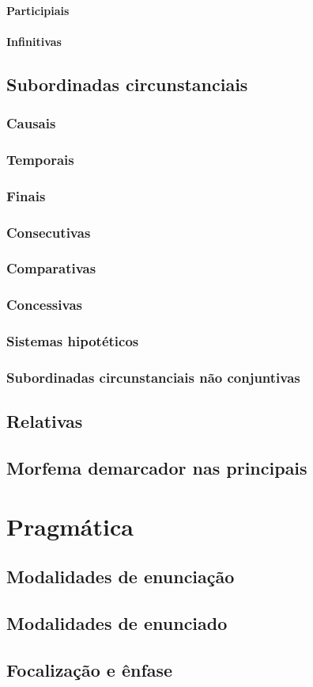 \paragraph{Participiais}
\lipsum[38]
\paragraph{Infinitivas}
\lipsum[39]

\subsection{Subordinadas circunstanciais}
\lipsum[40]
\subsubsection{Causais}
\lipsum[41]
\subsubsection{Temporais}
\lipsum[42]
\subsubsection{Finais}
\lipsum[43]
\subsubsection{Consecutivas}
\lipsum[44]
\subsubsection{Comparativas}
\lipsum[45]
\subsubsection{Concessivas}
\lipsum[46]
\subsubsection{Sistemas hipotéticos}
\lipsum[47]
\subsubsection{Subordinadas circunstanciais não conjuntivas}
\lipsum[48]

\subsection{Relativas}
\lipsum[49]
\subsection{Morfema demarcador nas principais}
\lipsum[50]

\section{Pragmática}
\lipsum[51]
\subsection{Modalidades de enunciação}
\lipsum[52]
\subsection{Modalidades de enunciado}
\lipsum[53]
\subsection{Focalização e ênfase}
\lipsum[54]

